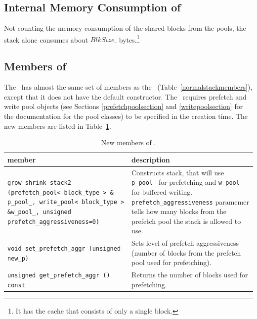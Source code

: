 \documentclass[twoside]{book}
\begin{document}

\subsection*{Internal Memory Consumption of \xgsstacktwo}
Not counting the memory consumption of the shared blocks from the
pools, the stack alone consumes about $BlkSize\_$ bytes.\footnote{It has
the cache that consists of only a single block.}

\subsection*{Members of \xgsstacktwo}
The \xgsstacktwo\ has almost the same set of members as the
\xnormalstack\
(Table~\ref{normalstackmembers}), except that it does not have the
default constructor. The \xgsstacktwo\ requires
prefetch and write pool objects (see Sections
\ref{prefetchpoolsection} and \ref{writepoolsection} for the
documentation for the pool classes) to be specified in the creation
time. 
The new members are listed in Table~\ref{gsstacktwomembers}.

\begin{table}[h]
\begin{center}
\caption{New members of \xgsstacktwo.}
\label{gsstacktwomembers}
\begin{tabular}{|p{6cm}|p{5cm}|}
\hline
member & description  \\
\hline\hline
\texttt{grow\_shrink\_stack2 (prefetch\_pool< block\_type > \&
p\_pool\_, write\_pool< block\_type > \&w\_pool\_, unsigned
prefetch\_aggressiveness=0)} &  Constructs stack, that will use
\texttt{p\_pool\_} for prefetching and \texttt{w\_pool\_} for buffered
writing. \texttt{prefetch\_aggressiveness} paramemer tells how many
blocks from the prefetch pool the stack is allowed to use.\\  
\hline
\texttt{void set\_prefetch\_aggr (unsigned new\_p)} & Sets level of
prefetch aggressiveness (number of blocks from the prefetch pool used
for prefetching). \\
\hline
\texttt{unsigned get\_prefetch\_aggr () const} & Returns the number of
blocks used for prefetching. \\
\hline
\end{tabular}
\end{center}
\end{table}


\newcommand{\xmstack}{\texttt{stxxl::migrating\_stack}}
\end{document}
